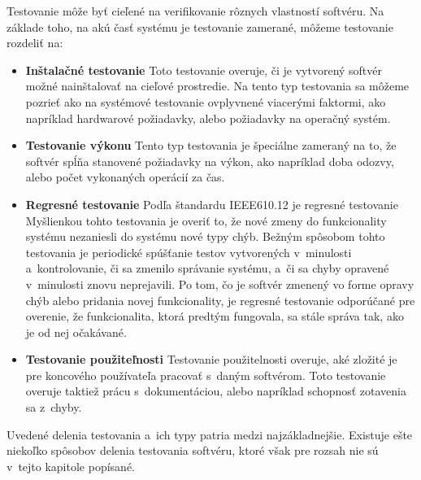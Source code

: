\noindent Testovanie môže byť cieľené na verifikovanie rôznych 
vlastností softvéru. Na základe toho, na akú časť systému je 
testovanie zamerané, môžeme testovanie rozdeliť na:
\begin{itemize}
\item \textbf{Inštalačné testovanie}
Toto testovanie overuje, či je vytvorený softvér možné nainštalovať
na cieľové prostredie. Na tento typ testovania sa môžeme pozrieť ako na 
systémové testovanie ovplyvnené viacerými faktormi, ako napríklad 
hardwarové požiadavky, alebo požiadavky na operačný systém. 

\item \textbf{Testovanie výkonu}
Tento typ testovania je špeciálne zameraný na to, že softvér spĺňa 
stanovené požiadavky na výkon, ako napríklad doba odozvy, alebo počet 
vykonaných operácií za čas. 

\item \textbf{Regresné testovanie} 
\label{sekcia:regresne_testovanie}
Podľa štandardu IEEE610.12 \cite{Ieee_glossary} je regresné testovanie 
Myšlienkou tohto testovania je overiť to, že nové zmeny do funkcionality 
systému nezaniesli do systému nové typy chýb.
Bežným spôsobom tohto testovania je periodické spúšťanie testov 
vytvorených v~minulosti a~kontrolovanie, či sa zmenilo správanie
systému, a~či sa chyby opravené v~minulosti znovu neprejavili. Po tom, 
čo je softvér zmenený vo forme opravy chýb alebo pridania novej 
funkcionality, je regresné testovanie odporúčané pre overenie, že 
funkcionalita, ktorá predtým fungovala, sa stále správa tak, ako je od 
nej očakávané.

\item \textbf{Testovanie použiteľnosti}
Testovanie použitelnosti overuje, aké zložité je pre koncového 
používateľa pracovať s~daným softvérom. Toto testovanie overuje taktiež 
prácu s~dokumentáciou, alebo napríklad schopnosť zotavenia sa z~chyby. 
\end{itemize}

Uvedené delenia testovania a~ich typy patria medzi najzákladnejšie. 
Existuje ešte niekoľko spôsobov delenia testovania softvéru, ktoré však 
pre rozsah nie sú v~tejto kapitole popísané.



